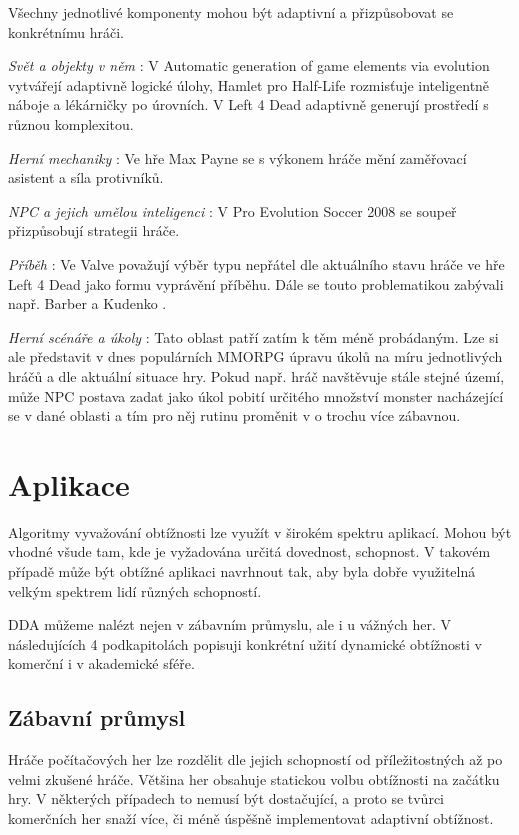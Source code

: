Všechny jednotlivé komponenty mohou být adaptivní a přizpůsobovat se konkrétnímu hráči. 

\textit{Svět a objekty v něm} : V Automatic generation of game elements via evolution\cite{17Evol} vytvářejí adaptivně logické úlohy, Hamlet \cite{20Hun} pro Half-Life rozmisťuje inteligentně náboje a lékárničky po úrovních. V Left 4 Dead adaptivně generují prostředí s různou komplexitou. 

\textit{Herní mechaniky} : Ve hře Max Payne se s výkonem hráče mění zaměřovací asistent a síla protivníků\cite{RiskTakers}.  

\textit{NPC a jejich umělou inteligenci} : V Pro Evolution Soccer 2008 se soupeř přizpůsobují strategii hráče\cite{6}. 

\textit{Příběh} : Ve Valve považují výběr typu nepřátel dle aktuálního stavu hráče ve hře Left 4 Dead jako formu vyprávění příběhu\cite{2}.  
Dále se touto problematikou zabývali např. Barber a Kudenko \cite{Narratives}. 

\textit{Herní scénáře a úkoly} : Tato oblast patří zatím k těm méně probádaným. Lze si ale představit v dnes populárních MMORPG úpravu úkolů na míru jednotlivých hráčů a dle aktuální situace hry. Pokud např. hráč navštěvuje stále stejné území, může NPC postava zadat jako úkol pobití určitého množství monster nacházející se v dané oblasti a tím pro něj rutinu proměnit v o trochu více zábavnou\cite{16Survey}. 


\section{Aplikace} \label{sec:aplikacedda}

Algoritmy vyvažování obtížnosti lze využít v širokém spektru aplikací. Mohou být vhodné všude tam, kde je vyžadována určitá dovednost, schopnost. V takovém případě může být obtížné aplikaci navrhnout tak, aby byla dobře využitelná velkým spektrem lidí různých schopností.

DDA můžeme nalézt nejen v zábavním průmyslu, ale i u vážných her. V následujících 4 podkapitolách popisuji konkrétní užití dynamické obtížnosti v komerční i v akademické sféře.

\subsection{Zábavní průmysl}

Hráče počítačových her lze rozdělit dle jejich schopností od příležitostných až po velmi zkušené hráče. Většina her obsahuje statickou volbu obtížnosti na začátku hry. V některých případech to nemusí být dostačující, a proto se tvůrci komerčních her snaží více, či méně úspěšně implementovat adaptivní obtížnost.


